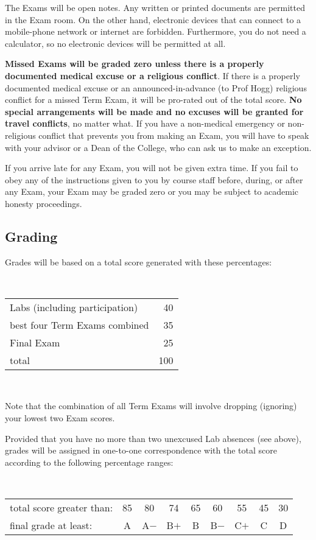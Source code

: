 \documentclass[12pt, letterpaper]{article}
\begin{document}
The Exams will be open notes. Any written or printed documents are
permitted in the Exam room. On the other hand, electronic devices that
can connect to a mobile-phone network or internet are
forbidden. Furthermore, you do not need a calculator, so no electronic
devices will be permitted at all.

\textbf{Missed Exams will be graded zero unless there is a properly
  documented medical excuse or a religious conflict}. If there is a
properly documented medical excuse or an announced-in-advance (to Prof
Hogg) religious conflict for a missed Term Exam, it will be pro-rated
out of the total score. \textbf{No special arrangements will be made
  and no excuses will be granted for travel conflicts}, no matter
what. If you have a non-medical emergency or non-religious conflict
that prevents you from making an Exam, you will have to speak with your
advisor or a Dean of the College, who can ask us to make an exception.

If you arrive late for any Exam, you will not be given extra time. If
you fail to obey any of the instructions given to you by course staff
before, during, or after any Exam, your Exam may be graded zero or you
may be subject to academic honesty proceedings.

\subsection*{Grading}

Grades will be based on a total score generated with these percentages:

\bigskip\noindent
~\hfill\begin{tabular}{lr}
\hline
Labs (including participation) &  40 \\
best four Term Exams combined  &  35 \\
Final Exam                     &  25 \\
\hline
total                          & 100 \\
\hline
\end{tabular}\hfill ~

\bigskip\noindent
Note that the combination of all Term Exams will involve dropping
(ignoring) your lowest two Exam scores.

Provided that you have no more than two unexcused Lab absences (see
above), grades will be assigned in one-to-one correspondence with the
total score according to the following percentage ranges:

\bigskip\noindent
~\hfill\begin{tabular}{lcccccccc}
\hline
total score greater than: & 85 & 80   & 74   & 65 & 60   & 55   & 45 & 30 \\
final grade at least:     & A  & A$-$ & B$+$ & B  & B$-$ & C$+$ & C  & D  \\
\hline
\end{tabular}\hfill~
\end{document}

